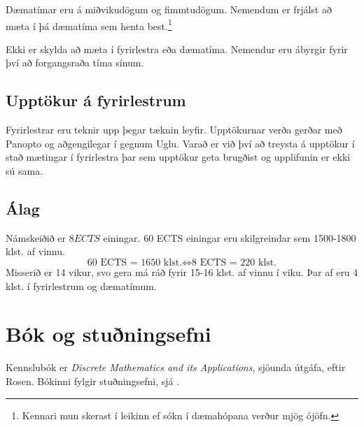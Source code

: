 \documentclass[justified, nobib]{tufte-handout}
\begin{document}
Dæmatímar eru á miðvikudögum og fimmtudögum. Nemendum er frjálst að mæta í þá dæmatíma sem henta best.\footnote{Kennari mun skerast í leikinn ef sókn í dæmahópana verður mjög ójöfn.}

Ekki er skylda að mæta í fyrirlestra eða dæmatíma. Nemendur eru ábyrgir fyrir því að forgangsraða tíma sínum.
\subsection{Upptökur á fyrirlestrum}
Fyrirlestrar eru teknir upp þegar tæknin leyfir.  Upptökurnar verða gerðar með Panopto og aðgengilegar í gegnum Uglu. Varað er við því að treysta á upptökur í stað mætingar í fyrirlestra þar sem upptökur geta brugðist og upplifunin er ekki sú sama.
\subsection{Álag}
Námskeiðið er $8 ECTS$ einingar. 60 ECTS einingar eru skilgreindar sem 1500-1800 klst. af vinnu.
\[
    \text{60 ECTS = 1650 klst.} \Longleftrightarrow \text{8 ECTS = 220 klst.}
\]
Misserið er 14 vikur, svo gera má ráð fyrir 15-16 klst. af vinnu í viku. Þar af eru 4 klst. í fyrirlestrum og dæmatímum.
\section[Bók]{Bók og stuðningsefni}
\label{sec:book}
Kennslubók er \emph{Discrete Mathematics and its Applications}, sjöunda útgáfa, eftir Rosen. Bókinni fylgir stuðningsefni, sjá .
\end{document}
